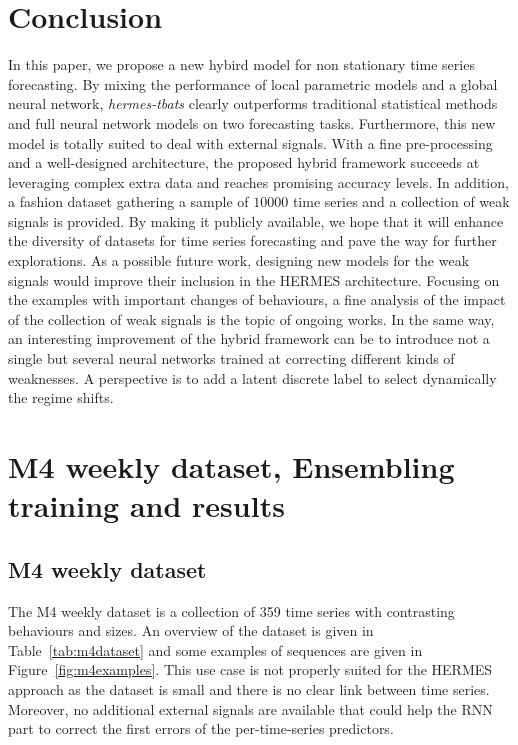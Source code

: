 \documentclass[review]{elsarticle}
\newcommand{\numberts}{10000}
\begin{document}
\section{Conclusion}
\label{sec:conclusion}
In this paper, we propose  a new hybird model for non stationary time series forecasting. By mixing the performance of local parametric models and a global neural network, \textit{hermes-tbats} clearly outperforms traditional statistical methods and full neural network models on two forecasting tasks. Furthermore, this new model is totally suited to deal with external signals. With a fine pre-processing and a well-designed architecture, the proposed hybrid framework succeeds at leveraging complex extra data and reaches promising accuracy levels. In addition, a fashion dataset gathering a sample of $\numberts$ time series and a collection of weak signals is provided. By making it publicly available, we hope that it will enhance the diversity of datasets for time series forecasting and pave the way for further explorations.
As a possible future work, designing new models for the weak signals would improve their inclusion  in the HERMES architecture. Focusing on the examples with important changes of behaviours, a fine analysis of the impact of the collection of weak signals is the topic of ongoing works. In the same way, an interesting improvement of the hybrid framework can be to introduce not a single but several neural networks trained at correcting different kinds of weaknesses. A perspective is to add a latent discrete label to select dynamically the regime shifts. 


\appendix


\section{M4 weekly dataset, Ensembling training and results}

\subsection{M4 weekly dataset}
\label{sec:m4overview}
The M4 weekly dataset is a collection of 359 time series with  contrasting behaviours and sizes. An overview of the dataset is given in Table~\ref{tab:m4dataset} and some examples of sequences are given in Figure~\ref{fig:m4examples}. This use case is not properly suited for the HERMES approach as the dataset is small and there is no clear link between time series. Moreover, no additional external signals are available that could help the RNN part to correct the first errors of the per-time-series predictors.
\end{document}
